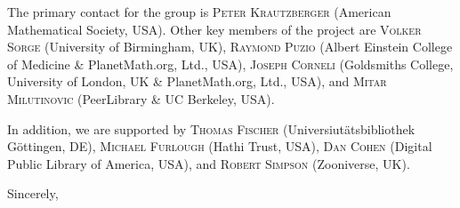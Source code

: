 \documentclass[10pt]{article}
\begin{document}
The primary contact for the group is \textsc{Peter Krautzberger}
(American Mathematical Society, USA).    Other
key members of the project are \textsc{Volker Sorge} (University of Birmingham, UK), \textsc{Raymond
  Puzio} (Albert Einstein College of Medicine \& PlanetMath.org, Ltd.,
USA), \textsc{Joseph Corneli} (Goldsmiths College, University of
London, UK \& PlanetMath.org, Ltd., USA), and \textsc{Mitar
  Milutinovic} (PeerLibrary \& UC Berkeley, USA).

In addition, we are supported by \textsc{Thomas Fischer} (Universiut{\"a}tsbibliothek
G{\"o}ttingen, DE), \textsc{Michael Furlough} (Hathi Trust, USA), \textsc{Dan Cohen} (Digital Public Library of America, USA), and \textsc{Robert Simpson} (Zooniverse, UK).
\begin{flushright}
Sincerely,\\
\quad \\
\quad \\
\quad 
\end{flushright}
\end{document}
